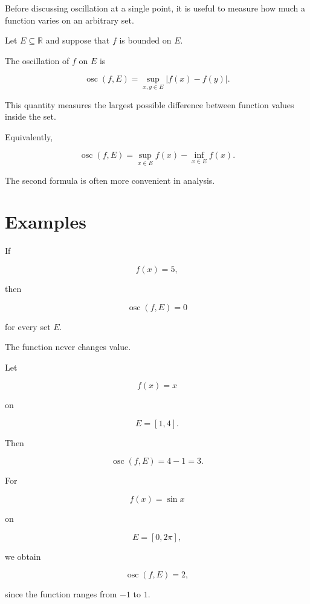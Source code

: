 \documentclass{essay}
\begin{document}
Before discussing oscillation at a single point, it is useful to measure how
much a function varies on an arbitrary set.

\begin{definition}

  Let \(E\subseteq\mathbb{R}\) and suppose that \(f\) is bounded on \(E\).

  The oscillation of \(f\) on \(E\) is

  \[ \operatorname{osc}(f,E) = \sup_{x,y\in E}|f(x)-f(y)|. \]

\end{definition}

This quantity measures the largest possible difference between function values
inside the set.

Equivalently,

\[ \operatorname{osc}(f,E) = \sup_{x\in E}f(x) - \inf_{x\in E}f(x). \]

The second formula is often more convenient in analysis.


\section{Examples}

\begin{example}

  If

  \[ f(x)=5, \]

  then

  \[ \operatorname{osc}(f,E)=0 \]

  for every set \(E\).

  The function never changes value.

\end{example}

\begin{example}

  Let

  \[ f(x)=x \]

  on

  \[ E=[1,4]. \]

  Then

  \[ \operatorname{osc}(f,E)=4-1=3. \]

\end{example}

\begin{example}

  For

  \[ f(x)=\sin x \]

  on

  \[ E=[0,2\pi], \]

  we obtain

  \[ \operatorname{osc}(f,E)=2, \]

  since the function ranges from \(-1\) to \(1\).

\end{example}
\end{document}
